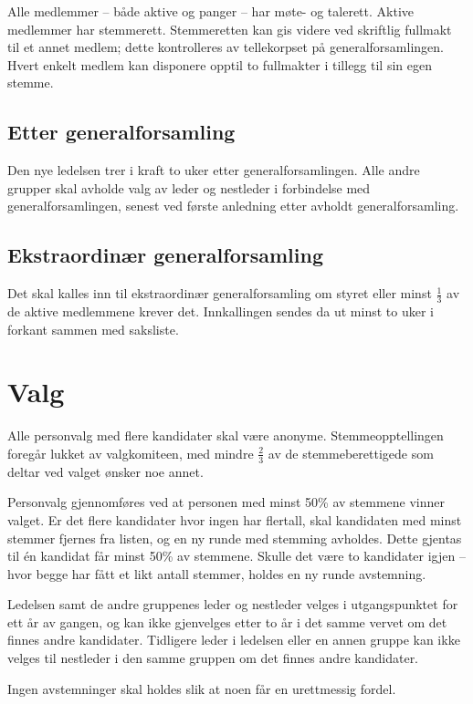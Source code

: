 Alle medlemmer -- både aktive og panger -- har møte- og talerett.
Aktive medlemmer har stemmerett.
Stemmeretten kan gis videre ved skriftlig fullmakt til et annet medlem; dette kontrolleres av tellekorpset på generalforsamlingen.
Hvert enkelt medlem kan disponere opptil to fullmakter i tillegg til sin egen stemme.

\subsection{Etter generalforsamling}\label{sec:generalforsamling:etter}
Den nye ledelsen trer i kraft to uker etter generalforsamlingen.
Alle andre grupper skal avholde valg av leder og nestleder i forbindelse med generalforsamlingen, senest ved første anledning etter avholdt generalforsamling.

\subsection{Ekstraordinær generalforsamling}\label{sec:generalforsamling:ekstraordinær}
Det skal kalles inn til ekstraordinær generalforsamling om styret eller minst $\frac{1}{3}$ av de aktive medlemmene krever det.
Innkallingen sendes da ut minst to uker i forkant sammen med saksliste.


\section{Valg}\label{sec:valg}
Alle personvalg med flere kandidater skal være anonyme.
Stemmeopptellingen foregår lukket av valgkomiteen, med mindre $\frac{2}{3}$ av de stemmeberettigede som deltar ved valget ønsker noe annet.

Personvalg gjennomføres ved at personen med minst 50\% av stemmene vinner valget.
Er det flere kandidater hvor ingen har flertall, skal kandidaten med minst stemmer fjernes fra listen, og en ny runde med stemming avholdes.
Dette gjentas til én kandidat får minst 50\% av stemmene.
Skulle det være to kandidater igjen -- hvor begge har fått et likt antall stemmer, holdes en ny runde avstemning.

Ledelsen samt de andre gruppenes leder og nestleder velges i utgangspunktet for ett år av gangen, og kan ikke gjenvelges etter to år i det samme vervet om det finnes andre kandidater.
Tidligere leder i ledelsen eller en annen gruppe kan ikke velges til nestleder i den samme gruppen om det finnes andre kandidater.

Ingen avstemninger skal holdes slik at noen får en urettmessig fordel.


